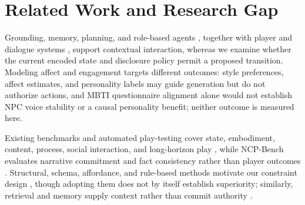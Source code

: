 \documentclass[journal]{IEEEtran}
\begin{document}
\section{Related Work and Research Gap}
Grounding, memory, planning, and role-based agents \cite{S03_weir2024ontologically,S20_ashby2023personalized,S07_park2023generative,S08_shao2023character}, together with player and dialogue systems \cite{S21_akoury2023player,S22_hochreiter2026beyond,S23_yin2026contextualized,S02_figueiredo2025scaffolded}, support contextual interaction, whereas we examine whether the current encoded state and disclosure policy permit a proposed transition. Modeling affect and engagement \cite{S24_yannakakis2011experiencedriven,S25_melhart2020engagement,S26_wang2026engagement} targets different outcomes: style preferences, affect estimates, and personality labels may guide generation but do not authorize actions, and MBTI questionnaire alignment alone would not establish NPC voice stability or a causal personality benefit; neither outcome is measured here.

Existing benchmarks and automated play-testing cover state, embodiment, content, process, social interaction, and long-horizon play \cite{S11_cote2019textworld,S12_wang2022scienceworld,S13_fan2022minedojo,S14_perezliebana2019gvgai,S15_liu2024agentbench,S16_ma2024agentboard,S17_zhou2024sotopia,S18_paglieri2025balrog,S19_lepelletier2022playtesting}, while NCP-Bench evaluates narrative commitment and fact consistency rather than player outcomes \cite{S58_ma2026ncpbench}. Structural, schema, affordance, and rule-based methods motivate our constraint design \cite{S09_geng2023grammar,S10_beurerkellner2023prompting,S36_scholak2021picard,S50_kambhampati2024llmmodulo,S51_ichter2023saycan,S52_wang2025agentspec,S53_li2025settingdc,S54_zhou2025story2game,S42_buongiorno2024pangea,S01_vaucher2026ivie,S44_gongora2026worldstate,S57_geng2025jsonschemabench}, though adopting them does not by itself establish superiority; similarly, retrieval and memory supply context rather than commit authority \cite{S04_he2024gretriever,S05_gutierrez2024hipporag,S06_chhikara2025mem0}.
\end{document}

